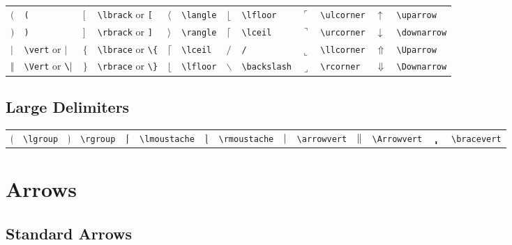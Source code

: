 \documentclass[10pt, english]{article}
\begin{document}
	\begin{center}
		\scriptsize
	\begin{tabular}{ll|ll|ll|ll|ll|ll}
		$($ & \verb|(| & $\lbrack$ & \verb|\lbrack| or \verb|[| & $\langle$ & \verb|\langle| & $\lfloor$ & \verb|\lfloor| & $\ulcorner$ & \verb|\ulcorner| & $\uparrow$ & \verb|\uparrow| \\
		$)$ & \verb|)| & $\rbrack$ & \verb|\rbrack| or \verb|]| & $\rangle$ & \verb|\rangle| & $\lceil$ & \verb|\lceil| & $\urcorner$ & \verb|\urcorner| & $\downarrow$ & \verb|\downarrow| \\
		$\vert$ & \verb|\vert| or $\mathtt{|}$ & $\lbrace$ & \verb|\lbrace| or \verb|\{| & $\lceil$ & \verb|\lceil| & $/$ & \verb|/| & $\llcorner$ & \verb|\llcorner| & $\Uparrow$ & \verb|\Uparrow| \\
		$\Vert$ & \verb|\Vert| or $\verb|\||$ & $\rbrace$ & \verb|\rbrace| or \verb|\}| & $\lfloor$ & \verb|\lfloor| & $\backslash$ & \verb|\backslash| & $\lrcorner$ & \verb|\rcorner| & $\Downarrow$ & \verb|\Downarrow| \\
	\end{tabular}
	\end{center}

	\subsection{Large Delimiters}

	\begin{center}
		\scriptsize
	\begin{tabular}{ll|ll|ll|ll|ll|ll|ll}
		$\lgroup$ & \verb|\lgroup| & $\rgroup$ & \verb|\rgroup| & $\lmoustache$ & \verb|\lmoustache| & $\rmoustache$ & \verb|\rmoustache| & $\arrowvert$ & \verb|\arrowvert| & $\Arrowvert$ & \verb|\Arrowvert| & $\bracevert$ & \verb|\bracevert| \\
	\end{tabular}
	\end{center}

\section{Arrows}	

	\subsection{Standard Arrows}
\end{document}
